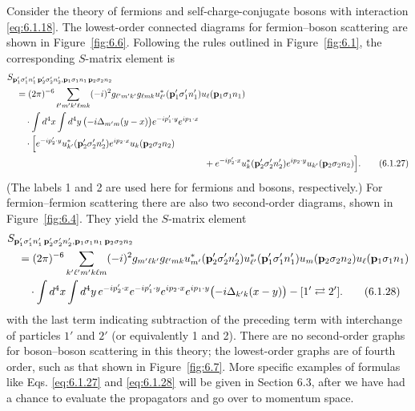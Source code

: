 Consider the theory of fermions and self-charge-conjugate bosons with
interaction \eqref{eq:6.1.18}. The lowest-order connected diagrams for fermion--boson
scattering are shown in Figure~\ref{fig:6.6}. Following the rules outlined in Figure~\ref{fig:6.1},
the corresponding $S$-matrix element is
\begin{align}
&S_{\mathbf p'_1\sigma'_1n'_1\,\mathbf p'_2\sigma'_2n'_2,
       \mathbf p_1\sigma_1n_1\,\mathbf p_2\sigma_2n_2}
\notag\\
&\quad=(2\pi)^{-6}\sum_{\ell'm'k'\ell m k}
 (-i)^2 g_{\ell'm'k'}g_{\ell m k}
 u_{\ell'}^*(\mathbf p'_1\sigma'_1n'_1)
 u_\ell(\mathbf p_1\sigma_1n_1)
\notag\\
&\qquad\cdot\int d^4x\int d^4y\,
 \bigl(-i\Delta_{m'm}(y-x)\bigr)
 e^{-ip'_1\cdot y}e^{ip_1\cdot x}
\notag\\
&\qquad\cdot\Bigl[
 e^{-ip'_2\cdot y}u_{k'}^*(\mathbf p'_2\sigma'_2n'_2)
 e^{ip_2\cdot x}u_k(\mathbf p_2\sigma_2n_2)
\notag\\
&\hspace{77mm}+
 e^{-ip'_2\cdot x}u_k^*(\mathbf p'_2\sigma'_2n'_2)
 e^{ip_2\cdot y}u_{k'}(\mathbf p_2\sigma_2n_2)
 \Bigr].
\tag{6.1.27}
\label{eq:6.1.27}
\end{align}
(The labels 1 and 2 are used here for fermions and bosons, respectively.) For
fermion--fermion scattering there are also two second-order diagrams, shown in
Figure~\ref{fig:6.4}. They yield the $S$-matrix element
\begin{align}
&S_{\mathbf p'_1\sigma'_1n'_1\,\mathbf p'_2\sigma'_2n'_2,
       \mathbf p_1\sigma_1n_1\,\mathbf p_2\sigma_2n_2}
\notag\\
&\quad=(2\pi)^{-6}\sum_{k'\ell'm'k\ell m}
 (-i)^2g_{m'\ell k'}g_{\ell'mk}
 u_{m'}^*(\mathbf p'_2\sigma'_2n'_2)
 u_{\ell'}^*(\mathbf p'_1\sigma'_1n'_1)
 u_m(\mathbf p_2\sigma_2n_2)u_\ell(\mathbf p_1\sigma_1n_1)
\notag\\
&\qquad\cdot\int d^4x\int d^4y\,
 e^{-ip'_2\cdot x}e^{-ip'_1\cdot y}
 e^{ip_2\cdot x}e^{ip_1\cdot y}
 \bigl(-i\Delta_{k'k}(x-y)\bigr)
 -[1'\rightleftarrows2'].
\tag{6.1.28}
\label{eq:6.1.28}
\end{align}
with the last term indicating subtraction of the preceding term with
interchange of particles $1'$ and $2'$ (or equivalently 1 and 2). There are no
second-order graphs for boson--boson scattering in this theory; the
lowest-order graphs are of fourth order, such as that shown in Figure~\ref{fig:6.7}. More
specific examples of formulas like Eqs. \eqref{eq:6.1.27} and \eqref{eq:6.1.28} will be given in
Section 6.3, after we have had a chance to evaluate the propagators and go over
to momentum space.

